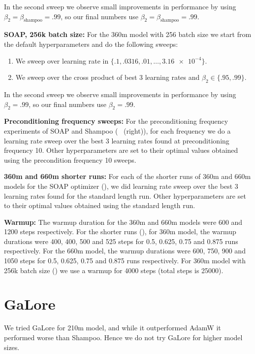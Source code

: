 \documentclass{article}
\begin{document}
In the second sweep we observe small improvements in performance by using $\beta_2 = \beta_{\text{shampoo}} = .99$, so our final numbers use $\beta_2 = \beta_{\text{shampoo}} = .99$. 

\textbf{SOAP, 256k batch size:}
For the 360m model with 256 batch size we start from the default hyperparameters and do the following sweeps:
\begin{enumerate}
    \item We sweep over learning rate in $\{.1, .0316, .01,\ldots, \num{3.16e-4}\}$.
    \item We sweep over the cross product of best 3 learning rates and $\beta_2 \in \{.95, .99\}$.
\end{enumerate}

In the second sweep we observe small improvements in performance by using $\beta_2 = .99$, so our final numbers use $\beta_2 = .99$. 

\textbf{Preconditioning frequency sweeps:} For the preconditioning frequency experiments of SOAP and Shampoo (~ (right)), for each frequency we do a learning rate sweep over the best 3 learning rates found at preconditioning frequency 10. Other hyperparameters are set to their optimal values obtained using the precondition frequency 10 sweeps.

\textbf{360m and 660m shorter runs:} For each of the shorter runs of 360m and 660m models for the SOAP optimizer (), we did learning rate sweep over the best 3 learning rates found for the standard length run. Other hyperparameters are set to their optimal values obtained using the standard length run.

\textbf{Warmup:} The warmup duration for the 360m and 660m models were 600 and 1200 steps respectively. For the shorter runs (), for 360m model, the warmup durations were 400, 400, 500 and 525 steps for 0.5, 0.625, 0.75 and 0.875 runs respectively. For the 660m model, the warmup durations were 600, 750, 900 and 1050 steps for 0.5, 0.625, 0.75 and 0.875 runs respectively. For 360m model with 256k batch size () we use a warmup for 4000 steps (total steps is 25000).

\section{GaLore}
\label{app:galore}

We tried GaLore for 210m model, and while it outperformed AdamW it performed worse than Shampoo. Hence we do not try GaLore for higher model sizes. 
\end{document}
